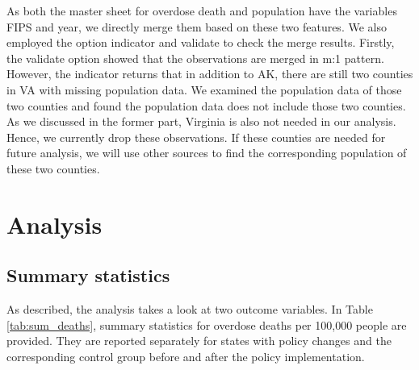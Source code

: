 \documentclass[12pt,letterpaper]{article}
\begin{document}
As both the master sheet for overdose death and population have the variables FIPS and year, we directly merge them based on these two features. We also employed the option indicator and validate to check the merge results. Firstly, the validate option showed that the observations are merged in m:1 pattern. However, the indicator returns that in addition to AK, there are still two counties in VA with missing population data. We examined the population data of those two counties and found the population data does not include those two counties. As we discussed in the former part, Virginia is also not needed in our analysis. Hence, we currently drop these observations. If these counties are needed for future analysis, we will use other sources to find the corresponding population of these two counties.

\section{Analysis}

\subsection{Summary statistics}
As described, the analysis takes a look at two outcome variables. In Table \ref{tab:sum_deaths}, summary statistics for overdose deaths per 100,000 people are provided. They are reported separately for states with policy changes and the corresponding control group before and after the policy implementation.
\end{document}

